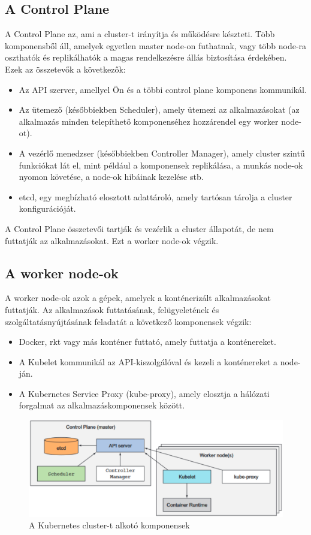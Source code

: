 \subsection{A Control Plane}
A Control Plane az, ami a cluster-t irányítja és működésre készteti. Több komponensből áll, amelyek egyetlen master node-on futhatnak, vagy több node-ra oszthatók és replikálhatók a magas rendelkezésre állás biztosítása érdekében. Ezek az összetevők a következők:
\begin{itemize}
    \item Az API szerver, amellyel Ön és a többi control plane komponens kommunikál.
    \item Az ütemező (későbbiekben Scheduler), amely ütemezi az alkalmazásokat (az alkalmazás minden telepíthető komponenséhez hozzárendel egy worker node-ot).
    \item A vezérlő menedzser (későbbiekben Controller Manager), amely cluster szintű funkciókat lát el, mint például a komponensek replikálása, a munkás node-ok nyomon követése, a node-ok hibáinak kezelése stb.
    \item etcd, egy megbízható elosztott adattároló, amely tartósan tárolja a cluster konfigurációját.
\end{itemize}
A Control Plane összetevői tartják és vezérlik a cluster állapotát, de nem futtatják az alkalmazásokat. Ezt a worker node-ok végzik.
\cite{Marko17}

\subsection{A worker node-ok}
A worker node-ok azok a gépek, amelyek a konténerizált alkalmazásokat futtatják. Az alkalmazások futtatásának, felügyeletének és szolgáltatásnyújtásának feladatát a következő komponensek végzik: \cite{Marko17}
\begin{itemize}
    \item Docker, rkt vagy más konténer futtató, amely futtatja a konténereket.
    \item A Kubelet kommunikál az API-kiszolgálóval és kezeli a konténereket a node-ján.
    \item A Kubernetes Service Proxy (kube-proxy), amely elosztja a hálózati forgalmat az alkalmazáskomponensek között.
\end{itemize}

\begin{figure}[ht]
    \centering
         \includegraphics[width=1.0\textwidth]{figures/kubernetes/cluster-overview.png}
          \caption{A Kubernetes cluster-t alkotó komponensek \cite{Marko17}}
           \label{cluster-overview}
\end{figure}

